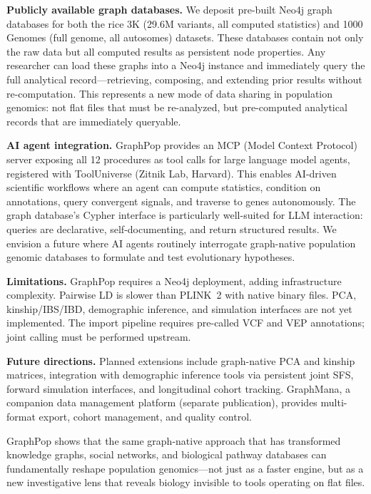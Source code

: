 \textbf{Publicly available graph databases.} We deposit pre-built Neo4j graph databases for both the rice 3K (29.6M variants, all computed statistics) and 1000 Genomes (full genome, all autosomes) datasets. These databases contain not only the raw data but all computed results as persistent node properties. Any researcher can load these graphs into a Neo4j instance and immediately query the full analytical record---retrieving, composing, and extending prior results without re-computation. This represents a new mode of data sharing in population genomics: not flat files that must be re-analyzed, but pre-computed analytical records that are immediately queryable.

\textbf{AI agent integration.} GraphPop provides an MCP (Model Context Protocol) server exposing all 12 procedures as tool calls for large language model agents, registered with ToolUniverse (Zitnik Lab, Harvard). This enables AI-driven scientific workflows where an agent can compute statistics, condition on annotations, query convergent signals, and traverse to genes autonomously. The graph database's Cypher interface is particularly well-suited for LLM interaction: queries are declarative, self-documenting, and return structured results. We envision a future where AI agents routinely interrogate graph-native population genomic databases to formulate and test evolutionary hypotheses.

\textbf{Limitations.} GraphPop requires a Neo4j deployment, adding infrastructure complexity. Pairwise LD is slower than PLINK~2 with native binary files. PCA, kinship/IBS/IBD, demographic inference, and simulation interfaces are not yet implemented. The import pipeline requires pre-called VCF and VEP annotations; joint calling must be performed upstream.

\textbf{Future directions.} Planned extensions include graph-native PCA and kinship matrices, integration with demographic inference tools via persistent joint SFS, forward simulation interfaces, and longitudinal cohort tracking. GraphMana, a companion data management platform (separate publication), provides multi-format export, cohort management, and quality control.

GraphPop shows that the same graph-native approach that has transformed knowledge graphs, social networks, and biological pathway databases can fundamentally reshape population genomics---not just as a faster engine, but as a new investigative lens that reveals biology invisible to tools operating on flat files.
